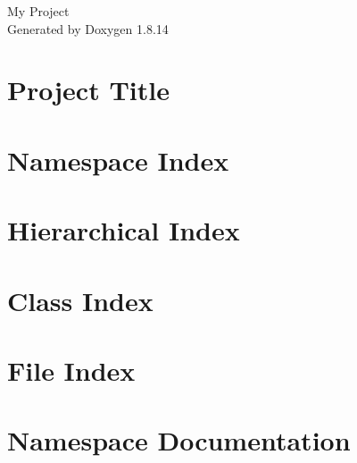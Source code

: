 \documentclass[twoside]{book}
\newcommand{\+}{\discretionary{\mbox{\scriptsize$\hookleftarrow$}}{}{}}
\newcommand{\clearemptydoublepage}{%
  \newpage{\pagestyle{empty}\cleardoublepage}%
}
\begin{document}
\hypersetup{pageanchor=false,
             bookmarksnumbered=true,
             pdfencoding=unicode
            }
\begin{titlepage}
\vspace*{7cm}
\begin{center}%
{\Large My Project }\\
\vspace*{1cm}
{\large Generated by Doxygen 1.8.14}\\
\end{center}
\end{titlepage}
\clearemptydoublepage
{}
\tableofcontents
\clearemptydoublepage
{}
\hypersetup{pageanchor=true}

\chapter{Project Title}
\label{md__home_tetard_IdeaProjects_jCoinche_Java_jcoinche_2017_README}

\chapter{Namespace Index}

\chapter{Hierarchical Index}

\chapter{Class Index}

\chapter{File Index}

\chapter{Namespace Documentation}







\end{document}
